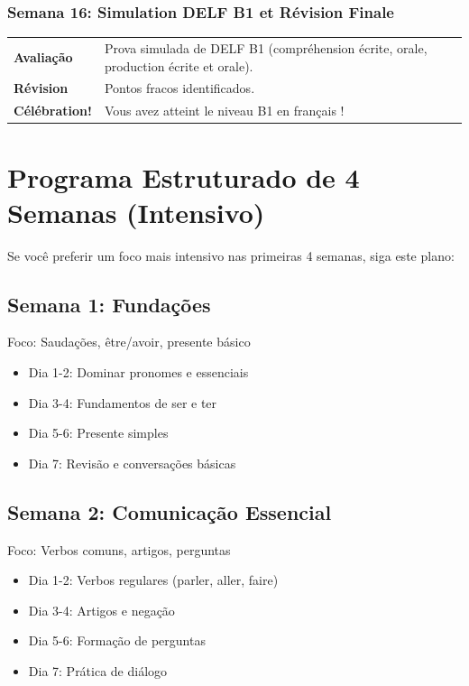 \documentclass[a4paper,12pt]{article}
\begin{document}
\subsubsection*{Semana 16: Simulation DELF B1 et Révision Finale}
\begin{tabularx}{\linewidth}{>{\bfseries}l L}
    Avaliação & Prova simulada de DELF B1 (compréhension écrite, orale, production écrite et orale). \\
    Révision & Pontos fracos identificados. \\
    Célébration! & Vous avez atteint le niveau B1 en français ! \\
\end{tabularx}

\section{Programa Estruturado de 4 Semanas (Intensivo)}
Se você preferir um foco mais intensivo nas primeiras 4 semanas, siga este plano:

\subsection{Semana 1: Fundações}
Foco: Saudações, être/avoir, presente básico \\
\begin{itemize}
    \item Dia 1-2: Dominar pronomes e essenciais
    \item Dia 3-4: Fundamentos de ser e ter
    \item Dia 5-6: Presente simples
    \item Dia 7: Revisão e conversações básicas
\end{itemize}

\subsection{Semana 2: Comunicação Essencial}
Foco: Verbos comuns, artigos, perguntas \\
\begin{itemize}
    \item Dia 1-2: Verbos regulares (parler, aller, faire)
    \item Dia 3-4: Artigos e negação
    \item Dia 5-6: Formação de perguntas
    \item Dia 7: Prática de diálogo
\end{itemize}
\end{document}
